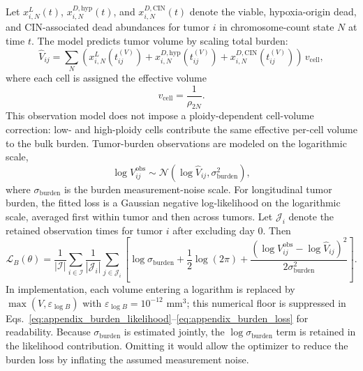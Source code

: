 \documentclass[11pt]{article}
\begin{document}
Let $x^{L}_{i,N}(t)$, $x^{D,\mathrm{hyp}}_{i,N}(t)$, and $x^{D,\mathrm{CIN}}_{i,N}(t)$ denote the viable, hypoxia-origin dead, and CIN-associated dead abundances for tumor $i$ in chromosome-count state $N$ at time $t$. The model predicts tumor volume by scaling total burden:
\begin{equation}
\widehat V_{ij}
=
\sum_{N}
\left(
x^{L}_{i,N}(t_{ij}^{(V)})
+
x^{D,\mathrm{hyp}}_{i,N}(t_{ij}^{(V)})
+
x^{D,\mathrm{CIN}}_{i,N}(t_{ij}^{(V)})
\right)
\,v_{\mathrm{cell}},
\label{eq:appendix_pred_volume}
\end{equation}
where each cell is assigned the effective volume
\begin{equation}
v_{\mathrm{cell}}
=
\frac{1}{\rho_{2N}}.
\label{eq:appendix_cell_volume_scale}
\end{equation}
This observation model does not impose a ploidy-dependent cell-volume correction: low- and high-ploidy cells contribute the same effective per-cell volume to the bulk burden.
Tumor-burden observations are modeled on the logarithmic scale,
\begin{equation}
\log V_{ij}^{\mathrm{obs}}
\sim
\mathcal N
\!\left(
\log \widehat V_{ij},
\sigma_{\mathrm{burden}}^2
\right),
\label{eq:appendix_burden_likelihood}
\end{equation}
where $\sigma_{\mathrm{burden}}$ is the burden measurement-noise scale. For longitudinal tumor burden, the fitted loss is a Gaussian negative log-likelihood on the logarithmic scale, averaged first within tumor and then across tumors. Let $\mathcal J_i$ denote the retained observation times for tumor $i$ after excluding day 0. Then
\begin{equation}
\mathcal L_B(\theta)
=
\frac{1}{|\mathcal I|}
\sum_{i\in\mathcal I}
\frac{1}{|\mathcal J_i|}
\sum_{j\in\mathcal J_i}
\left[
\log \sigma_{\mathrm{burden}}
+
\frac{1}{2}\log(2\pi)
+
\frac{
\left(
\log V_{ij}^{\mathrm{obs}}
-
\log \widehat V_{ij}
\right)^2
}{
2\sigma_{\mathrm{burden}}^2
}
\right].
\label{eq:appendix_burden_loss}
\end{equation}
In implementation, each volume entering a logarithm is replaced by $\max(V,\varepsilon_{\log B})$ with $\varepsilon_{\log B}=10^{-12}$ mm$^3$; this numerical floor is suppressed in Eqs.~\eqref{eq:appendix_burden_likelihood}--\eqref{eq:appendix_burden_loss} for readability. Because $\sigma_{\mathrm{burden}}$ is estimated jointly, the $\log \sigma_{\mathrm{burden}}$ term is retained in the likelihood contribution. Omitting it would allow the optimizer to reduce the burden loss by inflating the assumed measurement noise.
\end{document}
